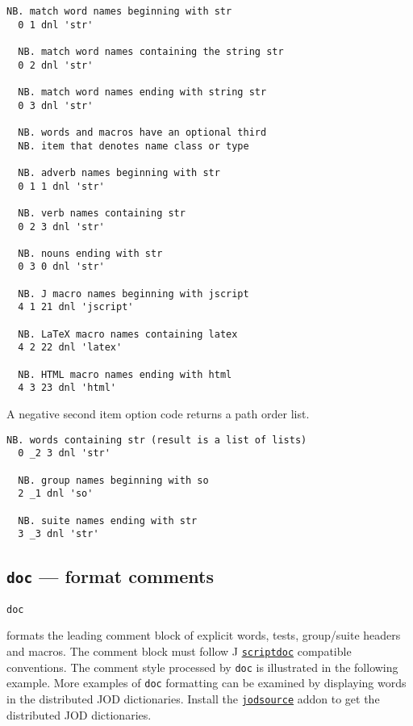 \begin{lstlisting}[frame=single,framerule=0pt]  
  NB. match word names beginning with str
  0 1 dnl 'str'  
  
  NB. match word names containing the string str
  0 2 dnl 'str'  
  
  NB. match word names ending with string str 
  0 3 dnl 'str'  

  NB. words and macros have an optional third
  NB. item that denotes name class or type
  
  NB. adverb names beginning with str
  0 1 1 dnl 'str'  
  
  NB. verb names containing str
  0 2 3 dnl 'str'  
  
  NB. nouns ending with str
  0 3 0 dnl 'str'  

  NB. J macro names beginning with jscript
  4 1 21 dnl 'jscript' 

  NB. LaTeX macro names containing latex
  4 2 22 dnl 'latex'   
  
  NB. HTML macro names ending with html 
  4 3 23 dnl 'html' 
 \end{lstlisting}  

  A negative second item option code returns a path order list.

\begin{lstlisting}[frame=single,framerule=0pt] 
  NB. words containing str (result is a list of lists)
  0 _2 3 dnl 'str' 
  
  NB. group names beginning with so
  2 _1 dnl 'so'   
  
  NB. suite names ending with str 
  3 _3 dnl 'str'   
\end{lstlisting}

\subsection{\texttt{doc} --- format comments}\label{ss:doc}

\hypertarget{il:doc}{\texttt{doc}} formats the leading comment block 
of explicit words, tests, group/suite headers and macros.  The comment block must follow J
\href{http://www.jsoftware.com/help/user/scriptdoc.htm}{\texttt{scriptdoc}}
 \cite{scriptdoc} compatible conventions.  The comment style processed by \texttt{doc} is 
illustrated in the following example. More examples of \texttt{doc} 
formatting can be examined by displaying 
words in the distributed JOD dictionaries. 
Install the \href{http://www.jsoftware.com/jwiki/Addons/general/jodsource}{\texttt{jodsource}} 
addon to get the distributed JOD dictionaries.

